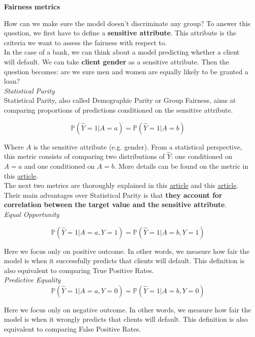 {\fontsize{12pt}{22pt} \textbf{Fairness metrics}\par}

\vspace{5mm}

How can we make sure the model doesn’t discriminate any group? To answer this question, we first have to define a \textbf{sensitive attribute}. This attribute is the criteria we want to assess the fairness with respect to. \\
In the case of a bank, we can think about a model predicting whether a client will default. We can take \textbf{client gender} as a sensitive attribute. Then the question becomes: are we sure men and women are equally likely to be granted a loan? \\

\textit{Statistical Parity} \\

Statistical Parity, also called Demographic Parity or Group Fairness, aims at comparing proportions of predictions conditioned on the sensitive attribute. 

$$\mathbb{P}(\hat Y= 1|A=a) =\mathbb{P}(\hat Y= 1|A=b)$$

Where $A$ is the sensitive attribute (e.g. gender). From a statistical perspective, this metric consists of comparing two distributions of $\hat Y$: one conditioned on $A = a$ and one conditioned on $A=b$. More details can be found on the metric in this \href{https://arxiv.org/pdf/1701.08230.pdf}{article}. \\

The next two metrics are thoroughly explained in this \href{https://arxiv.org/pdf/1610.02413.pdf}{article} and this \href{https://arxiv.org/pdf/1701.08230.pdf}{article}. Their main advantages over Statistical Parity is that \textbf{they account for correlation between the target value and the sensitive attribute}. \\

\textit{Equal Opportunity}

$$\mathbb{P}(\hat Y= 1|A=a,Y= 1) = \mathbb{P}(\hat Y= 1|A=b,Y= 1)$$

Here we focus only on positive outcome. In other words, we measure how fair the model is when it successfully predicts that clients will default. This definition is also equivalent to comparing True Positive Rates. \\

\textit{Predictive Equality} \\

$$\mathbb{P}(\hat Y= 1|A=a,Y= 0) = \mathbb{P}(\hat Y= 1|A=b,Y= 0)$$

Here we focus only on negative outcome. In other words, we measure how fair the model is when it wrongly predicts that clients will default. This definition is also equivalent to comparing False Positive Rates.

\vspace{5mm}